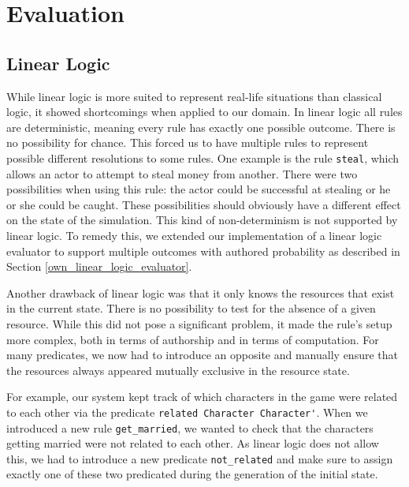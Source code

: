 \section{Evaluation} \label{evaluation}

\subsection{Linear Logic}
While linear logic is more suited to represent real-life situations than classical logic, it showed shortcomings when applied to our domain.
In linear logic all rules are deterministic, meaning every rule has exactly one possible outcome.
There is no possibility for chance.
This forced us to have multiple rules to represent possible different resolutions to some rules.
One example is the rule \lstinline{steal}, which allows an actor to attempt to steal money from another.
There were two possibilities when using this rule: the actor could be successful at stealing or he or she could be caught.
These possibilities should obviously have a different effect on the state of the simulation.
This kind of non-determinism is not supported by linear logic.
To remedy this, we extended our implementation of a linear logic evaluator to support multiple outcomes with authored probability as described in Section \ref{own_linear_logic_evaluator}.

Another drawback of linear logic was that it only knows the resources that exist in the current state.
There is no possibility to test for the absence of a given resource.
While this did not pose a significant problem, it made the rule's setup more complex, both in terms of authorship and in terms of computation.
For many predicates, we now had to introduce an opposite and manually ensure that the resources always appeared mutually exclusive in the resource state.

For example, our system kept track of which characters in the game were related to each other via the predicate \lstinline{related Character Character'}.
When we introduced a new rule \lstinline{get_married}, we wanted to check that the characters getting married were not related to each other.
As linear logic does not allow this, we had to introduce a new predicate \lstinline{not_related} and make sure to assign exactly one of these two predicated during the generation of the initial state.

